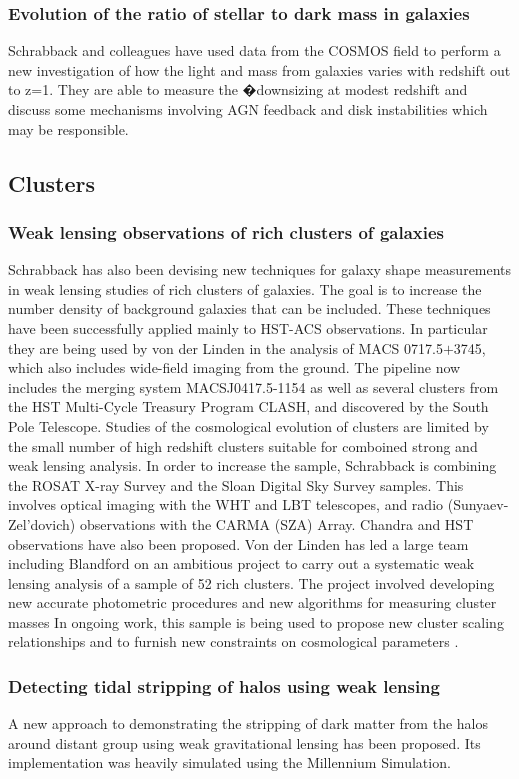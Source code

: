 \documentclass[psfig,11pt]{article}
\begin{document}
\subsubsection{Evolution of the ratio of stellar to dark mass in galaxies}
Schrabback and colleagues have used data from the COSMOS field to perform a new investigation of how the light and mass from galaxies varies with redshift out to z=1. They are able to measure the �downsizing at modest redshift and discuss some mechanisms involving AGN feedback and disk instabilities which may be responsible.
\subsection{Clusters}
\subsubsection{Weak lensing observations of rich clusters of galaxies}
Schrabback has also been devising new techniques for galaxy shape measurements in weak lensing studies of rich clusters of galaxies. The goal is to increase the number density of background galaxies that can be included. These techniques have been successfully applied mainly to HST-ACS observations. In particular they are being used by von der Linden in the analysis of MACS 0717.5$+$3745, which also includes wide-field imaging from the ground. The pipeline now includes the merging system MACSJ0417.5-1154 as well as several clusters from the HST Multi-Cycle Treasury Program CLASH, and discovered by the South Pole Telescope. Studies of the cosmological evolution of clusters are limited by the small number of high redshift clusters suitable for comboined strong and weak lensing analysis. In order to increase the sample, Schrabback is combining the ROSAT X-ray Survey and the Sloan Digital Sky Survey samples. This involves optical imaging with the WHT and LBT telescopes, and radio (Sunyaev-Zel'dovich) observations with the CARMA (SZA) Array. Chandra and HST observations have also been proposed. Von der Linden has led a large team including Blandford on an ambitious project to carry out a systematic weak lensing analysis of a sample of 52 rich clusters. The project involved developing  new accurate photometric procedures and  new algorithms for measuring cluster masses In ongoing work, this sample is being used to propose new cluster scaling relationships and to furnish new constraints on cosmological parameters .
\subsubsection{Detecting tidal stripping of halos using weak lensing}
A new approach to demonstrating the stripping of dark matter from the halos around distant group using weak gravitational lensing has been proposed. Its implementation was heavily simulated using the Millennium Simulation.
\end{document}
